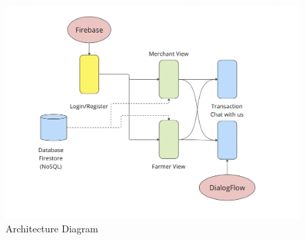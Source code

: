 \documentclass{article}
\begin{document}
\begin{figure}[htbp]
  \centering
  \includegraphics[width=01\linewidth]{arch.png}
  \caption{Architecture Diagram}
\end{figure}
\FloatBarrier
\end{document}
